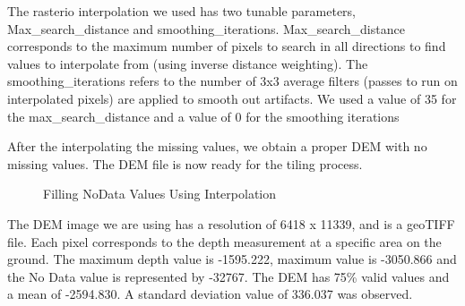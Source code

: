 \documentclass[sigconf,natbib=false]{acmart}
\begin{document}
The rasterio interpolation we used has two tunable parameters, Max\_search\_distance and smoothing\_iterations. Max\_search\_distance corresponds to the maximum number of pixels to search in all directions to find values to interpolate from (using inverse distance weighting). The smoothing\_iterations refers to the number of 3x3 average filters (passes to run on interpolated pixels) are applied to smooth out artifacts. We used a value of 35 for the max\_search\_distance and a value of 0 for the smoothing iterations

After the interpolating the missing values, we obtain a proper DEM with no missing values. The DEM file is now ready for the tiling process.
\begin{figure}[ht]
    \centering
    \caption{Filling NoData Values Using Interpolation}
\end{figure}

The DEM image we are using has a resolution of 6418 x 11339, and is a geoTIFF file. Each pixel corresponds to the depth measurement at a specific area on the ground. The maximum depth value is -1595.222, maximum value is -3050.866 and the No Data value is represented by -32767. The DEM has 75\% valid values and a mean of -2594.830. A standard deviation value of 336.037 was observed.
\end{document}
